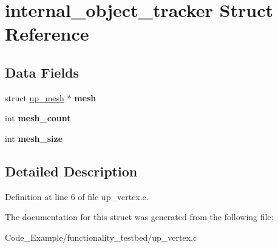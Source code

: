 \hypertarget{structinternal__object__tracker}{}\section{internal\+\_\+object\+\_\+tracker Struct Reference}
\label{structinternal__object__tracker}
\subsection*{Data Fields}
\begin{DoxyCompactItemize}
\item 
\hypertarget{structinternal__object__tracker_acced85f2aea7e05c9e25c80c8a76767d}{}struct \hyperlink{structup__mesh}{up\+\_\+mesh} $\ast$ {\bfseries mesh}\label{structinternal__object__tracker_acced85f2aea7e05c9e25c80c8a76767d}

\item 
\hypertarget{structinternal__object__tracker_a2fa3169b8ce96226ef635db0df665b44}{}int {\bfseries mesh\+\_\+count}\label{structinternal__object__tracker_a2fa3169b8ce96226ef635db0df665b44}

\item 
\hypertarget{structinternal__object__tracker_a1e768067f58db90a3aa93b2040941b2c}{}int {\bfseries mesh\+\_\+size}\label{structinternal__object__tracker_a1e768067f58db90a3aa93b2040941b2c}

\end{DoxyCompactItemize}


\subsection{Detailed Description}


Definition at line 6 of file up\+\_\+vertex.\+c.



The documentation for this struct was generated from the following file\+:\begin{DoxyCompactItemize}
\item 
Code\+\_\+\+Example/functionality\+\_\+testbed/up\+\_\+vertex.\+c\end{DoxyCompactItemize}
